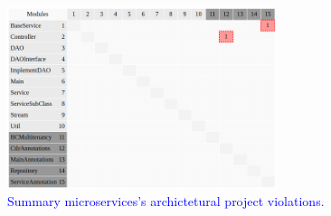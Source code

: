 \documentclass[12pt]{article}
\begin{document}
\begin{figure}[ht]
\centering
\includegraphics[width=0.7\textwidth]{figuras/violacoesSummary.png}
\caption{\textcolor{blue}{Summary microservices's archictetural project violations.}}
\label{fig:microservices}
\end{figure}
% 
\end{document}
